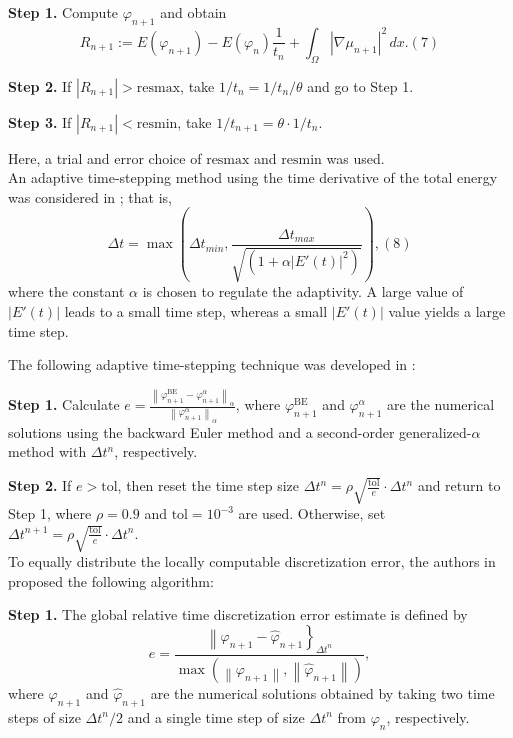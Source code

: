 \documentclass{article}
\begin{document}
\textbf{Step 1.} Compute $\varphi_{n+1}$ and obtain
\begin{equation}
R_{n+1} := E(\varphi_{n+1}) - E(\varphi_n) \frac{1}{t_n} + \int_{\Omega} \left|\nabla\mu_{n+1}\right|^2 \, dx. (7)
\end{equation}

\textbf{Step 2.} If $\left|R_{n+1}\right| > \text{resmax}$, take $1/t_n = 1/t_n/\theta$ and go to Step 1.

\textbf{Step 3.} If $\left|R_{n+1}\right| < \text{resmin}$, take $1/t_{n+1} = \theta \cdot 1/t_n$.

Here, a trial and error choice of $\text{resmax}$ and $\text{resmin}$ was used.\\

An adaptive time-stepping method using the time derivative of the total energy was considered in \cite{ref18}; that is,
\begin{equation}
\Delta t = \max(\Delta t_{min}, \frac{\Delta t_{max}}{\sqrt{ \left(1 + \alpha \left|E'(t)\right|^2\right)}}), (8)
\end{equation}
where the constant $\alpha$ is chosen to regulate the adaptivity. A large value of $\left|E'(t)\right|$ leads to a small time step, whereas a small $\left|E'(t)\right|$ value yields a large time step.

The following adaptive time-stepping technique was developed in \cite{ref19}:

\textbf{Step 1.} Calculate $e = \frac{\left\|\varphi_{n+1}^{\text{BE}} - \varphi_{n+1}^{\alpha}\right\|_{\alpha}}{\left\|\varphi_{n+1}^{\alpha}\right\|_{\alpha}}$, where $\varphi_{n+1}^{\text{BE}}$ and $\varphi_{n+1}^{\alpha}$ are the numerical solutions using the backward Euler method and a second-order generalized-$\alpha$ method with $\Delta t^n$, respectively.

\textbf{Step 2.} If $e > \text{tol}$, then reset the time step size $\Delta t^n = \rho\sqrt{\frac{\text{tol}}{e}}\cdot\Delta t^n$ and return to Step 1, where $\rho = 0.9$ and $\text{tol} = 10^{-3}$ are used. Otherwise, set $\Delta t^{n+1} = \rho\sqrt{\frac{\text{tol}}{e}}\cdot\Delta t^n$.\\

To equally distribute the locally computable discretization error, the authors in \cite{ref20} proposed the following algorithm:

\textbf{Step 1.} The global relative time discretization error estimate is defined by
\begin{equation}
e = \frac{\left\|\varphi_{n+1} - \hat{\varphi}_{n+1}\right\}_{\Delta t^n}}{\max\left(\left\|\varphi_{n+1}\right\|, \left\|\hat{\varphi}_{n+1}\right\|\right)},
\end{equation}
where $\varphi_{n+1}$ and $\hat{\varphi}_{n+1}$ are the numerical solutions obtained by taking two time steps of size $\Delta t^n/2$ and a single time step of size $\Delta t^n$ from $\varphi_n$, respectively.
\end{document}

